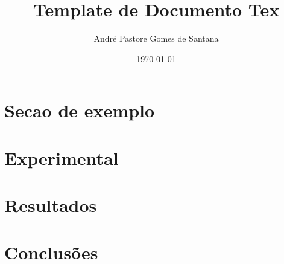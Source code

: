\documentclass[11pt,a4paper]{report}
\author{Andr\'e Pastore Gomes de Santana}
\title{Template de Documento Tex}
\date{\today}
\begin{document}
\maketitle

\tableofcontents

\begin{abstract}
\end{abstract}

\section{Secao de exemplo}

\section{Experimental}

\section{Resultados}

\section{Conclus\~{o}es}



\printindex
\end{document}
